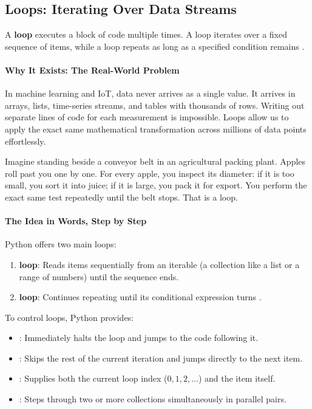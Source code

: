 \subsection{Loops: Iterating Over Data Streams}

\begin{keyidea}
A \textbf{loop} executes a block of code multiple times. A  loop iterates over a fixed sequence of items, while a  loop repeats as long as a specified condition remains .
\end{keyidea}

\paragraph{Why It Exists: The Real-World Problem}
In machine learning and IoT, data never arrives as a single value. It arrives in arrays, lists, time-series streams, and tables with thousands of rows. Writing out separate lines of code for each measurement is impossible. Loops allow us to apply the exact same mathematical transformation across millions of data points effortlessly.

\begin{analogy}
Imagine standing beside a conveyor belt in an agricultural packing plant. Apples roll past you one by one. For every apple, you inspect its diameter: if it is too small, you sort it into juice; if it is large, you pack it for export. You perform the exact same test repeatedly until the belt stops. That is a  loop.
\end{analogy}

\paragraph{The Idea in Words, Step by Step}
Python offers two main loops:
\begin{enumerate}
    \item \textbf{ loop}: Reads items sequentially from an iterable (a collection like a list or a range of numbers) until the sequence ends.
    \item \textbf{ loop}: Continues repeating until its conditional expression turns .
\end{enumerate}
To control loops, Python provides:
\begin{itemize}
    \item {}: Immediately halts the loop and jumps to the code following it.
    \item {}: Skips the rest of the current iteration and jumps directly to the next item.
    \item {}: Supplies both the current loop index ($0, 1, 2, \dots$) and the item itself.
    \item {}: Steps through two or more collections simultaneously in parallel pairs.
\end{itemize}

